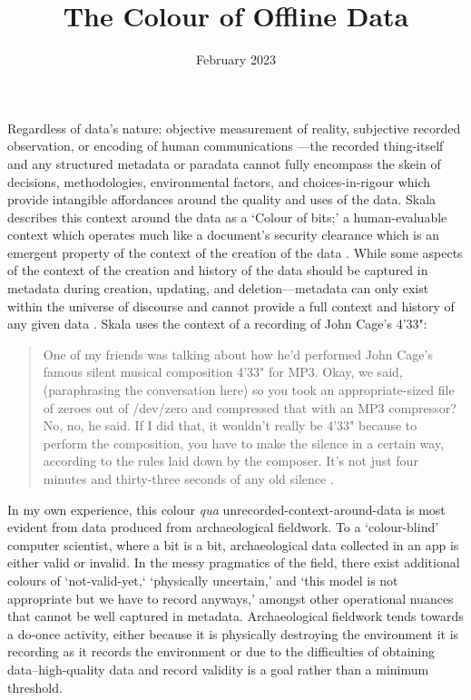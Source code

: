 \documentclass{scrarticle}
\title{The Colour of Offline Data}
\date{February 2023}
\begin{document}
\maketitle
{}




Regardless of data's nature: objective measurement of reality, subjective recorded observation, or encoding of human communications \parencite{Ballsun-Stanton2010-cn}---the recorded thing-itself and any structured metadata or paradata \parencite{Borjesson2022-jl}
cannot fully encompass the skein of decisions, methodologies, environmental factors, and choices-in-rigour which provide intangible affordances around the quality and uses of the data. Skala describes this context around the data as a `Colour of bits;' a human-evaluable context which operates much like a document's security clearance which is an emergent property of the context of the creation of the data \parencite*{Skala2004-zc}. While some aspects of the context of the creation and history of the data should be captured in metadata during creation, updating, and deletion---metadata can only exist within the universe of discourse and cannot provide a full context and history of any given data
. Skala uses the context of a recording of John Cage's 4'33":
\begin{quote}
One of my friends was talking about how he'd performed John Cage's famous silent musical composition 4'33" for MP3.  Okay, we said, (paraphrasing the conversation here) so you took an appropriate-sized file of zeroes out of /dev/zero and compressed that with an MP3 compressor?  No, no, he said.  If I did that, it wouldn't really be 4'33" because to perform the composition, you have to make the silence in a certain way, according to the rules laid down by the composer.  It's not just four minutes and thirty-three seconds of any old silence  \parencite*{Skala2004-zc}.
\end{quote}

In my own experience, this colour \textit{qua} unrecorded-context-around-data is most evident from data produced from archaeological fieldwork. To a `colour-blind' computer scientist, where a bit is a bit, archaeological data collected in an app is either valid or invalid. In the messy pragmatics of the field, there exist additional colours of `not-valid-yet,` `physically uncertain,' and `this model is not appropriate but we have to record anyways,' amongst other operational nuances that cannot be well captured in metadata. Archaeological fieldwork tends towards a do-once activity, either because it is physically destroying the environment it is recording as it records the environment or due to the difficulties of obtaining data--high-quality data and record validity is a goal rather than a minimum threshold.
\end{document}
